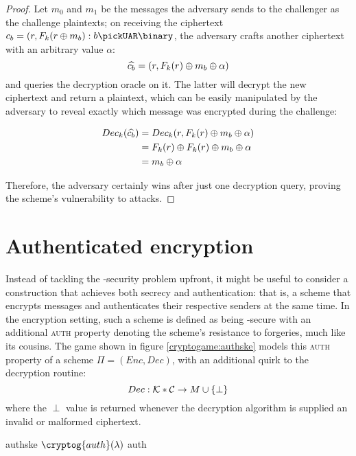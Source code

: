 \begin{proof}

    Let $m_0$ and $m_1$ be the messages the adversary sends to the challenger as the challenge plaintexts; on receiving the ciphertext $c_b = (r, F_k(r \xor m_b) : b \pickUAR \binary$, the adversary crafts another ciphertext with an arbitrary value $\alpha$:
    \[
        \widehat{c_b} = (r, F_k(r) \oplus m_b \oplus \alpha)
    \]
    and queries the decryption oracle on it. The latter will decrypt the new ciphertext and return a plaintext, which can be easily manipulated by the adversary to reveal exactly which message was encrypted during the challenge:

    \begin{align*}
        Dec_k(\widehat{c_b}) &= Dec_k(r, F_k(r) \oplus m_b \oplus \alpha) \\
        &= F_k(r) \oplus F_k(r) \oplus m_b \oplus \alpha \\
        &= m_b \oplus \alpha
    \end{align*}

    Therefore, the adversary certainly wins after just one decryption query, proving the scheme's vulnerability to \cca{} attacks.
   
\end{proof}

\section{Authenticated encryption}

Instead of tackling the \cca-security problem upfront, it might be useful to consider a construction that achieves both secrecy and authentication: that is, a scheme that encrypts messages and authenticates their respective senders at the same time. In the encryption setting, such a scheme is defined as being \cpa-secure with an additional \textsc{auth} property denoting the scheme's resistance to forgeries, much like its \mac{} cousins. The game shown in figure \ref{cryptogame:authske} models this \textsc{auth} property of a scheme $\Pi = (Enc, Dec)$, with an additional quirk to the decryption routine:
\[
    Dec:\mathcal{K}*\mathcal{C} \to M \cup \{\perp\}
\]
where the $\perp$ value is returned whenever the decryption algorithm is supplied an invalid or malformed ciphertext.

\begin{cryptogame}
    {authske}
    {$\cryptog{auth}(\lambda)$}
    {auth}


    \cseqbeginloop
    \cseqendloop

    \cseqdelay


\end{cryptogame} 

